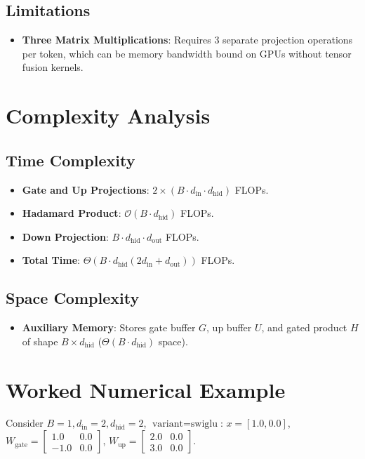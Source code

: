\documentclass[11pt,a4paper]{article}
\theoremstyle{definition}
\begin{document}
\subsection{Limitations}
\begin{itemize}
    \item \textbf{Three Matrix Multiplications}: Requires 3 separate projection operations per token, which can be memory bandwidth bound on GPUs without tensor fusion kernels.
\end{itemize}

\section{Complexity Analysis}

\subsection{Time Complexity}
\begin{itemize}
    \item \textbf{Gate and Up Projections}: $2 \times (B \cdot d_{\text{in}} \cdot d_{\text{hid}})$ FLOPs.
    \item \textbf{Hadamard Product}: $\mathcal{O}(B \cdot d_{\text{hid}})$ FLOPs.
    \item \textbf{Down Projection}: $B \cdot d_{\text{hid}} \cdot d_{\text{out}}$ FLOPs.
    \item \textbf{Total Time}: $\Theta\left(B \cdot d_{\text{hid}} (2 d_{\text{in}} + d_{\text{out}})\right)$ FLOPs.
\end{itemize}

\subsection{Space Complexity}
\begin{itemize}
    \item \textbf{Auxiliary Memory}: Stores gate buffer $G$, up buffer $U$, and gated product $H$ of shape $B \times d_{\text{hid}}$ ($\Theta(B \cdot d_{\text{hid}})$ space).
\end{itemize}

\section{Worked Numerical Example}

Consider $B=1, d_{\text{in}}=2, d_{\text{hid}}=2$, $\text{variant} = \text{swiglu}$:
$x = [1.0, 0.0]$, $W_{\text{gate}} = \begin{bmatrix} 1.0 & 0.0 \\ -1.0 & 0.0 \end{bmatrix}$, $W_{\text{up}} = \begin{bmatrix} 2.0 & 0.0 \\ 3.0 & 0.0 \end{bmatrix}$.
\end{document}
